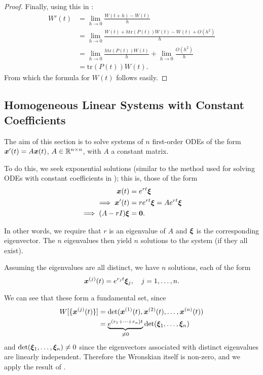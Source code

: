 \begin{proof}
	Finally, using this in :
	\begin{align*}
		W'(t) &= \lim_{h\to 0} \frac{W(t+h) - W(t)}{h} \\
		&= \lim_{h\to 0} \frac{W(t) + h \text{tr}(P(t)) W(t) - W(t) + O(h^2)}{h} \\
		&= \lim_{h\to 0} \frac{h\text{tr}(P(t)) W(t)}{h} + \lim_{h\to 0}\frac{O(h^2)}{h} \\
		&= \text{tr}(P(t)) W(t).
	\end{align*}
	From which the formula for $W(t)$ follows easily.
\end{proof}

\subsection{Homogeneous Linear Systems with Constant Coefficients}\label{sec:homocc}

The aim of this section is to solve systems of $n$ first-order ODEs of the form $\bm{x}'(t) = A \bm{x}(t)$, $A \in \mathbb{R}^{n\times n}$, with $A$ a constant matrix.

To do this, we seek exponential solutions (similar to the method used for solving ODEs with constant coefficients in ); this is, those of the form
\begin{align*}
	\bm{x}(t) &= e^{rt} \bm{\xi} \\
	\implies \bm{x}'(t) &= re^{rt} \bm{\xi} = A e^{rt} \bm{\xi} \\
	\implies (A-rI)\bm{\xi} &= \bm{0}.
\end{align*}

In other words, we require that $r$ is an eigenvalue of $A$ and $\bm{\xi}$ is the corresponding eigenvector. The $n$ eigenvalues then yield $n$ solutions to the system (if they all exist).

Assuming the eigenvalues are all distinct, we have $n$ solutions, each of the form
\[
\bm{x}^{(j)}(t) = e^{r_j t} \bm{\xi}_j, \quad j = 1, \ldots, n.
\]

We can see that these form a fundamental set, since
\begin{align*}
	W[\{\bm{x}^{(j)}(t)\}] &= \det(\bm{x}^{(1)}(t), \bm{x}^{(2)}(t), \ldots, \bm{x}^{(n)}(t)) \\
	&= \underbrace{e^{(r_1 + \cdots + r_n)t}}_{\neq 0} \det (\bm{\xi}_1, \ldots, \bm{\xi}_n)
\end{align*}
and $\det (\bm{\xi}_1, \ldots, \bm{\xi}_n) \neq 0$ since the eigenvectors associated with distinct eigenvalues are linearly independent. Therefore the Wronskian itself is non-zero, and we apply the result of .


